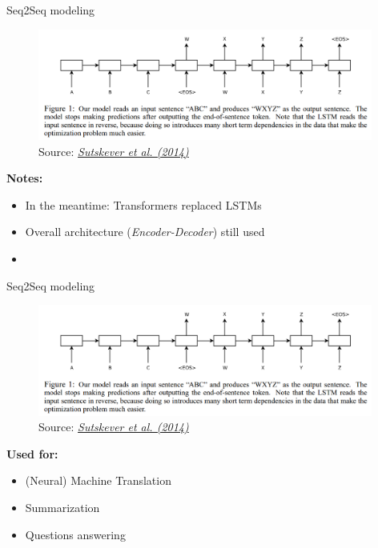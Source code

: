 
\begin{vbframe}{Seq2Seq modeling}

\vfill

	\begin{figure}
		\centering
		\includegraphics[width = 11cm]{figure/seq2seq.png}\\ 
		\footnotesize{Source:} \href{https://arxiv.org/pdf/1409.3215.pdf}{\footnotesize \it Sutskever et al. (2014)}
	\end{figure}

\textbf{Notes:}

\begin{itemize}
	\item In the meantime: Transformers replaced LSTMs
	\item Overall architecture (\textit{Encoder-Decoder}) still used
	\item[]
\end{itemize}

\vfill

\end{vbframe}


\begin{vbframe}{Seq2Seq modeling}

\vfill

	\begin{figure}
		\centering
		\includegraphics[width = 11cm]{figure/seq2seq.png}\\ 
		\footnotesize{Source:} \href{https://arxiv.org/pdf/1409.3215.pdf}{\footnotesize \it Sutskever et al. (2014)}
	\end{figure}

\textbf{Used for:}

\begin{itemize}
	\item (Neural) Machine Translation
	\item Summarization
	\item Questions answering
\end{itemize}

\vfill

\end{vbframe}

